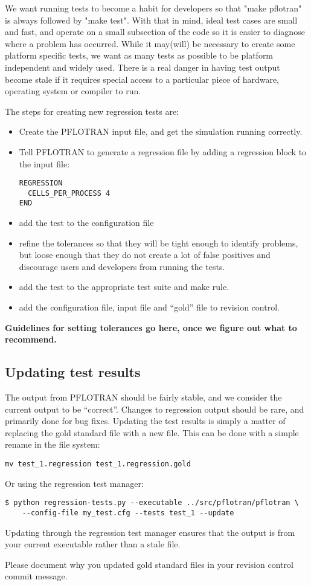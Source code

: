 We want running tests to become a habit for developers so that "make
pflotran" is always followed by "make test". With that in mind, ideal
test cases are small and fast, and operate on a small subsection of
the code so it is easier to diagnose where a problem has
occurred. While it may(will) be necessary to create some platform
specific tests, we want as many tests as possible to be platform
independent and widely used. There is a real danger in having test
output become stale if it requires special access to a particular
piece of hardware, operating system or compiler to run.

The steps for creating new regression tests are:
\begin{itemize}
\item Create the PFLOTRAN input file, and get the simulation running
  correctly.

\item Tell PFLOTRAN to generate a regression file by adding a
  regression block to the input file:
\begin{verbatim}
REGRESSION
  CELLS_PER_PROCESS 4
END
\end{verbatim}

\item add the test to the configuration file

\item refine the tolerances so that they will be tight enough to
  identify problems, but loose enough that they do not create a lot of
  false positives and discourage users and developers from running the
  tests.

\item add the test to the appropriate test suite and make rule.

\item add the configuration file, input file and ``gold'' file to revision control.

\end{itemize}

\textbf{Guidelines for setting tolerances go here, once we figure out what to recommend.}

\subsection{Updating test results}
The output from PFLOTRAN should be fairly stable, and we consider the
current output to be ``correct''. Changes to regression output should
be rare, and primarily done for bug fixes. Updating the test results
is simply a matter of replacing the gold standard file with a new
file. This can be done with a simple rename in the file system:
\begin{verbatim}
mv test_1.regression test_1.regression.gold
\end{verbatim}
Or using the regression test manager:
\begin{verbatim}
$ python regression-tests.py --executable ../src/pflotran/pflotran \
    --config-file my_test.cfg --tests test_1 --update
\end{verbatim}
Updating through the regression test manager ensures that the output
is from your current executable rather than a stale file.

Please document why you updated gold standard files in
your revision control commit message.
